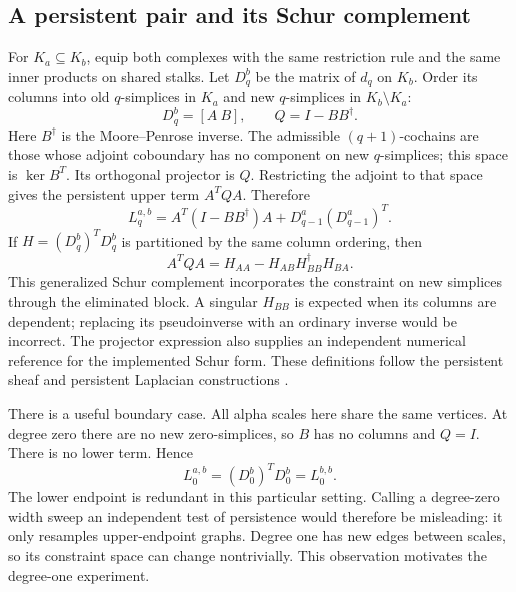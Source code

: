 \documentclass[11pt]{article}
\begin{document}
\subsection{A persistent pair and its Schur complement}
For $K_a\subseteq K_b$, equip both complexes with the same restriction rule and the same inner products on shared stalks. Let $D_q^b$ be the matrix of $d_q$ on $K_b$. Order its columns into old $q$-simplices in $K_a$ and new $q$-simplices in $K_b\setminus K_a$:
\begin{equation}
D_q^b=[A\ B],\qquad Q=I-BB^\dagger.
\label{eq:partition}
\end{equation}
Here $B^\dagger$ is the Moore--Penrose inverse. The admissible $(q+1)$-cochains are those whose adjoint coboundary has no component on new $q$-simplices; this space is $\ker B^T$. Its orthogonal projector is $Q$. Restricting the adjoint to that space gives the persistent upper term $A^TQA$. Therefore
\begin{equation}
L_q^{a,b}=A^T(I-BB^\dagger)A+D_{q-1}^a(D_{q-1}^a)^T.
\label{eq:persistent}
\end{equation}
If $H=(D_q^b)^TD_q^b$ is partitioned by the same column ordering, then
\begin{equation}
A^TQA=H_{AA}-H_{AB}H_{BB}^\dagger H_{BA}.
\label{eq:schur}
\end{equation}
This generalized Schur complement incorporates the constraint on new simplices through the eliminated block. A singular $H_{BB}$ is expected when its columns are dependent; replacing its pseudoinverse with an ordinary inverse would be incorrect. The projector expression also supplies an independent numerical reference for the implemented Schur form. These definitions follow the persistent sheaf and persistent Laplacian constructions \citep{wei2025,memoli2022}.

There is a useful boundary case. All alpha scales here share the same vertices. At degree zero there are no new zero-simplices, so $B$ has no columns and $Q=I$. There is no lower term. Hence
\begin{equation}
L_0^{a,b}=(D_0^b)^TD_0^b=L_0^{b,b}.
\label{eq:degree0-redundant}
\end{equation}
The lower endpoint is redundant in this particular setting. Calling a degree-zero width sweep an independent test of persistence would therefore be misleading: it only resamples upper-endpoint graphs. Degree one has new edges between scales, so its constraint space can change nontrivially. This observation motivates the degree-one experiment.
\end{document}
